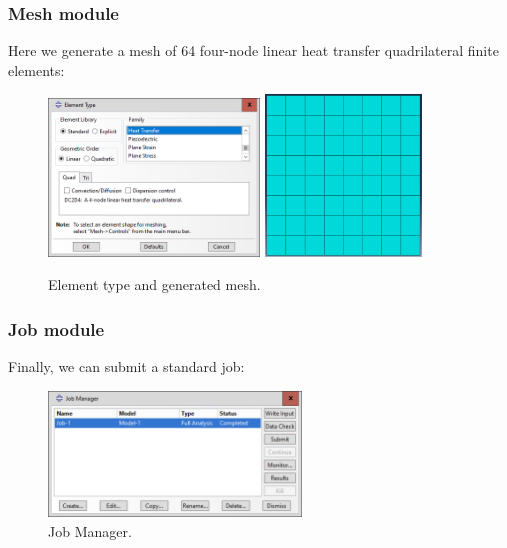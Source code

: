 \newpage

\subsubsection{Mesh module}

Here we generate a mesh of 64 four-node linear heat transfer quadrilateral finite elements:
\begin{figure}[H]
    \centering
    \includegraphics[width=0.5\textwidth]{Images/ab2/ab13.png} \qquad
    \includegraphics[width=0.37\textwidth]{Images/ab2/ab14.png}
    \caption{Element type and generated mesh.}
    \label{fig:ab1314}
\end{figure}

\subsubsection{Job module} 

Finally, we can submit a standard job:
\begin{figure}[H]
    \centering
    \includegraphics[width=0.6\textwidth]{Images/ab2/ab15.png}
    \caption{Job Manager.}
    \label{fig:ab15}
\end{figure}

